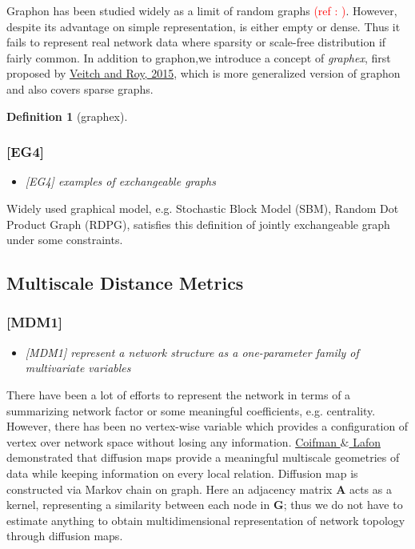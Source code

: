 \documentclass[12pt]{article}
\theoremstyle{definition}
\newtheorem{definition}{Definition}[section]
\begin{document}
Graphon has been studied widely as a limit of random graphs \textcolor{red}{(ref : )}. However, despite its advantage on simple representation, is either empty or dense. Thus it fails to represent real network data where sparsity or scale-free distribution if fairly common. In addition to graphon,we introduce a concept of \textit{graphex}, first proposed by \href{http://arxiv.org/abs/1512.03099}{Veitch and Roy, 2015}, which is more generalized version of graphon and also covers sparse graphs.

\begin{definition}[graphex]
	\label{graphex}
	

	
\end{definition}



\subsubsection{[EG4]}
\begin{itemize}
	\item {\it  [EG4] examples of exchangeable graphs \/}
\end{itemize}

Widely used graphical model, e.g. Stochastic Block Model (SBM), Random Dot Product Graph (RDPG), satisfies this definition of jointly exchangeable graph under some constraints. 



\subsection{Multiscale Distance Metrics}


\subsubsection{[MDM1]}
\begin{itemize}
	\item {\it  [MDM1] represent a network structure as a one-parameter family of multivariate variables \/}
\end{itemize}

There have been a lot of efforts to represent the network in terms of a summarizing network factor\cite{Hoff} or some meaningful coefficients, e.g. centrality\cite{centrality1}\cite{centrality2}. However, there has been no vertex-wise variable which provides a configuration of vertex over network space without losing any information. \hyperlink{Coifman}{Coifman $\&$ Lafon}\cite{Coifman} demonstrated that diffusion maps provide a meaningful multiscale geometries of data while keeping information on every local relation. Diffusion map is constructed via Markov chain on graph. Here an adjacency matrix $\boldsymbol{A}$ acts as a kernel, representing a similarity between each node in $\boldsymbol{G}$; thus we do not have to estimate anything to obtain multidimensional representation of network topology through diffusion maps. 
\end{document}

